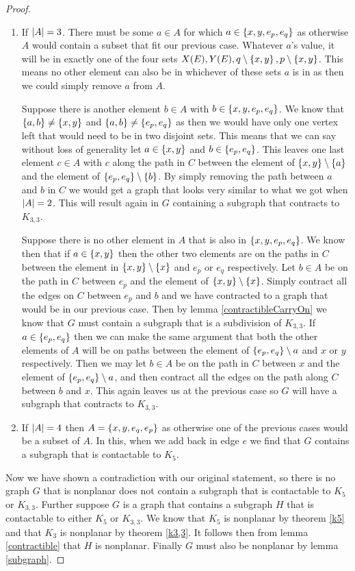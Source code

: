 \documentclass{article}
\begin{document}
\begin{proof}
\begin{enumerate}
		\item If $\left| {A} \right| = 3$. There must be some $a\in A$ for which $a\in\left\{ {x,y,e_p,e_q} \right\}$ as otherwise $A$ would contain a subset that fit our previous case. Whatever $a$'s value, it will be in exactly one of the four sets $X(E),Y(E),q\setminus\left\{ {x,y} \right\},p\setminus\left\{ {x,y} \right\}$. This means no other element can also be in whichever of these sets $a$ is in as then we could simply remove $a$ from $A$.
		
		
		Suppose there is another element $b\in A$ with $b \in\left\{ {x,y,e_p,e_q} \right\}$. We know that $\left\{ {a,b} \right\}\not=\left\{ {x,y} \right\}$ and $\left\{ {a,b} \right\}\not=\left\{ {e_p,e_q} \right\}$ as then we would have only one vertex left that would need to be in two disjoint sets. This means that we can say without loss of generality let $a \in\left\{ {x,y} \right\}$ and $b\in\left\{ {e_p,e_q} \right\}$. This leaves one last element $c\in A$ with $c$ along the path in $C$ between the element of $\left\{ {x,y} \right\}\setminus\left\{ {a} \right\}$ and the element of $\left\{ {e_p,e_q} \right\}\setminus\left\{ {b} \right\}$. By simply removing the path between $a$ and $b$ in $C$ we would get a graph that looks very similar to what we got when $\left| {A} \right| = 2$. This will result again in $G$ containing a subgraph that contracts to $K_{3,3}$.
		
		Suppose there is no other element in $A$ that is also in $\left\{ {x,y,e_p,e_q} \right\}$. We know then that if $a\in\left\{ {x,y} \right\}$ then the other two elements are on the paths in $C$ between the element in $\left\{ {x,y} \right\}\setminus\left\{ {x} \right\}$ and $e_p$ or $e_q$ respectively. Let $b\in A$ be on the path in $C$ between $e_p$ and the element of $\left\{ {x,y} \right\}\setminus\left\{ {x} \right\}$. Simply contract all the edges on $C$ between $e_p$ and $b$ and we have contracted to a graph that would be in our previous case. Then by lemma \ref{contractibleCarryOn} we know that $G$ must contain a subgraph that is a subdivision of $K_{3,3}$. If $a\in\left\{ {e_p,e_q} \right\}$ then we can make the same argument that both the other elements of $A$ will be on paths between the element of $\left\{ {e_p,e_q} \right\}\setminus a$ and $x$ or $y$ respectively. Then we may let $b\in A$ be on the path in $C$ between $x$ and the element of $\left\{ {e_p,e_q} \right\}\setminus a$, and then contract all the edges on the path along $C$ between $b$ and $x$. This again leaves us at the previous case so $G$ will have a subgraph that contracts to $K_{3,3}$.
		
		\item If $\left| {A} \right| = 4$ then $A = \left\{ {x,y,e_q,e_p} \right\}$ as otherwise one of the previous cases would be a subset of $A$. In this, when we add back in edge $e$ we find that $G$ contains a subgraph that is contactable to $K_5$.
	\end{enumerate}

	Now we have shown a contradiction with our original statement, so there is no graph $G$ that is nonplanar does not contain a subgraph that is contactable to $K_5$ or $K_{3,3}$. Further suppose $G$ is a graph that contains a subgraph $H$ that is contactable to either $K_5$ or $K_{3,3}$. We know that $K_5$ is nonplanar by theorem \ref{k5} and that $K_3$ is nonplanar by theorem \ref{k3,3}. It follows then from lemma \ref{contractible} that $H$ is nonplanar. Finally $G$ must also be nonplanar by lemma \ref{subgraph}.
\end{proof}
\end{document}
